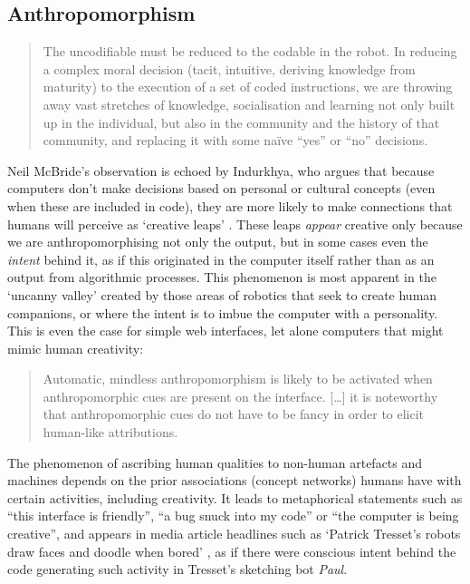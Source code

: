 \subsection{Anthropomorphism}
\label{ss:anthropomorphism}

\begin{quotation}
  The uncodifiable must be reduced to the codable in the robot. In reducing a complex moral decision (tacit, intuitive, deriving knowledge from maturity) to the execution of a set of coded instructions, we are throwing away vast stretches of knowledge, socialisation and learning not only built up in the individual, but also in the community and the history of that community, and replacing it with some na{\"i}ve ``yes'' or ``no'' decisions. 
\end{quotation}

Neil McBride's observation is echoed by Indurkhya, who argues that because computers don't make decisions based on personal or cultural concepts (even when these are included in code), they are more likely to make connections that humans will perceive as `creative leaps' \autocite{Indurkhya}. These leaps \emph{appear} creative only because we are anthropomorphising not only the output, but in some cases even the \emph{intent} behind it, as if this originated in the computer itself rather than as an output from algorithmic processes. This phenomenon is most apparent in the `uncanny valley' created by those areas of robotics that seek to create human companions, or where the intent is to imbue the computer with a personality. This is even the case for simple web interfaces, let alone computers that might mimic human creativity:

\begin{quotation}
  Automatic, mindless anthropomorphism is likely to be activated when anthropomorphic cues are present on the interface. [\ldots] it is noteworthy that anthropomorphic cues do not have to be fancy in order to elicit human-like attributions. 
\end{quotation}

The phenomenon of ascribing human qualities to non-human artefacts and machines depends on the prior associations (concept networks) humans have with certain activities, including creativity. It leads to metaphorical statements such as ``this interface is friendly'', ``a bug snuck into my code'' or ``the computer is being creative'', and appears in media article headlines such as `Patrick Tresset\rq s robots draw faces and doodle when bored' \autocite{Wired2011}, as if there were conscious intent behind the code generating such activity in Tresset's sketching bot \textit{Paul}.

